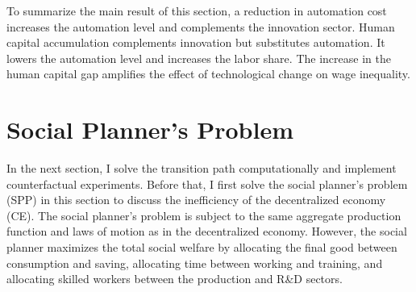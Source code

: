 \documentclass[12pt]{article}
\begin{document}
To summarize the main result of this section, a reduction in automation cost increases the automation level and complements the innovation sector. Human capital accumulation complements innovation but substitutes automation. It lowers the automation level and increases the labor share. The increase in the human capital gap amplifies the effect of technological change on wage inequality. 

\section{Social Planner's Problem }
In the next section, I solve the transition path computationally and implement counterfactual experiments. Before that, I first solve the social planner's problem (SPP) in this section to discuss the inefficiency of the decentralized economy (CE). The social planner's problem is subject to the same aggregate production function and laws of motion as in the decentralized economy. However, the social planner maximizes the total social welfare by allocating the final good between consumption and saving, allocating time between working and training, and allocating skilled workers between the production and R\&D sectors. 
\end{document}
